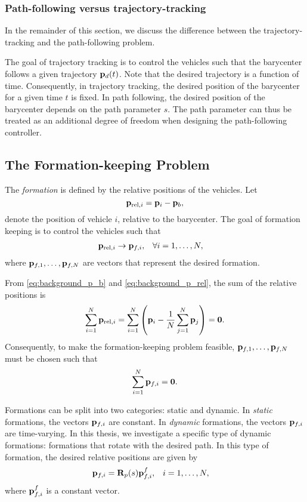 \subsubsection{Path-following versus trajectory-tracking}
In the remainder of this section, we discuss the difference between the trajectory-tracking and the path-following problem.

The goal of trajectory tracking is to control the vehicles such that the barycenter follows a given trajectory $\mathbf{p}_d(t)$.
Note that the desired trajectory is a function of time.
Consequently, in trajectory tracking, the desired position of the barycenter for a given time $t$ is fixed.
In path following, the desired position of the barycenter depends on the path parameter $s$.
The path parameter can thus be treated as an additional degree of freedom when designing the path-following controller.

\subsection{The Formation-keeping Problem}
\label{sec:background_formation_keeping}
The \emph{formation} is defined by the relative positions of the vehicles.
Let
\begin{equation}
    \mathbf{p}_{{\rm rel}, i} = \mathbf{p}_i - \mathbf{p}_b,
    \label{eq:background_p_rel}
\end{equation}
denote the position of vehicle $i$, relative to the barycenter.
The goal of formation keeping is to control the vehicles such that
\begin{align}
    &\mathbf{p}_{{\rm rel}, i} \rightarrow \mathbf{p}_{f, i}, &
    & \forall i = 1, \ldots, N,
\end{align}
where $\mathbf{p}_{f, 1}, \ldots, \mathbf{p}_{f, N}$ are vectors that represent the desired formation.

From \eqref{eq:background_p_b} and \eqref{eq:background_p_rel}, the sum of the relative positions is
\begin{equation}
    \sum_{i=1}^N \mathbf{p}_{{\rm rel}, i} = \sum_{i=1}^N \left(\mathbf{p}_i - \frac{1}{N}\sum_{j=1}^N \mathbf{p}_j \right) = \mathbf{0}.
\end{equation}
Consequently, to make the formation-keeping problem feasible, $\mathbf{p}_{f, 1}, \ldots, \mathbf{p}_{f, N}$ must be chosen such that
\begin{equation}
    \sum_{i=1}^N \mathbf{p}_{f, i} = \mathbf{0}.
\end{equation}

Formations can be split into two categories: static and dynamic.
In \emph{static} formations, the vectors $\mathbf{p}_{f, i}$ are constant.
In \emph{dynamic} formations, the vectors $\mathbf{p}_{f, i}$ are time-varying.
In this thesis, we investigate a specific type of dynamic formations: formations that rotate with the desired path.
In this type of formation, the desired relative positions are given by
\begin{align}
    \mathbf{p}_{f, i} &= \mathbf{R}_p(s) \mathbf{p}_{f, i}^f,&
    i &= 1, \ldots, N,
\end{align}
where $\mathbf{p}_{f, i}^f$ is a constant vector.

